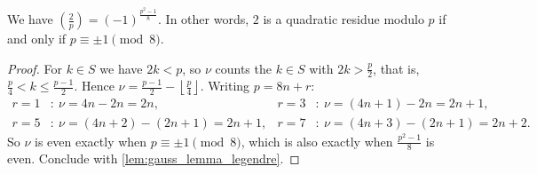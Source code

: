 \begin{proposition}\label{prop:legendre_two}
    We have $\left(\frac{2}{p}\right) = (-1)^{\frac{p^2-1}{8}}$. In other words, $2$ is a quadratic residue modulo $p$ if and only if $p \equiv \pm 1 \pmod 8$.
\end{proposition}
\begin{proof}
    For $k \in S$ we have $2k < p$, so $\nu$ counts the $k \in S$ with $2k > \frac{p}{2}$, that is, $\frac{p}{4} < k \le \frac{p-1}{2}$. Hence $\nu = \frac{p-1}{2} - \left\lfloor \frac{p}{4} \right\rfloor$. Writing $p = 8n + r$:
    \begin{equation*}
        \begin{aligned}
            r = 1&: \ \nu = 4n - 2n = 2n, & r = 3&: \ \nu = (4n + 1) - 2n = 2n + 1,\\
            r = 5&: \ \nu = (4n + 2) - (2n + 1) = 2n + 1, & r = 7&: \ \nu = (4n + 3) - (2n + 1) = 2n + 2.
        \end{aligned}
    \end{equation*}
    So $\nu$ is even exactly when $p \equiv \pm 1 \pmod 8$, which is also exactly when $\frac{p^2 - 1}{8}$ is even. Conclude with \cref{lem:gauss_lemma_legendre}.
\end{proof}
